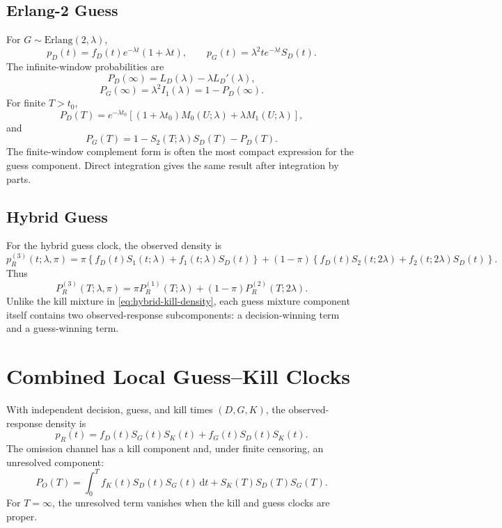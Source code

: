 \documentclass[12pt]{article}
\newcommand{\dd}{\,\mathrm{d}}
\begin{document}
\subsection{Erlang-2 Guess}
For $G\sim\mathrm{Erlang}(2,\lambda)$,
\begin{equation}
  p_D(t)=f_D(t)e^{-\lambda t}(1+\lambda t),
  \qquad
  p_G(t)=\lambda^2t e^{-\lambda t}S_D(t).
\end{equation}
The infinite-window probabilities are
\begin{equation}
  P_D(\infty)=L_D(\lambda)-\lambda L_D'(\lambda),
\end{equation}
\begin{equation}
  P_G(\infty)=\lambda^2I_1(\lambda)
  =1-P_D(\infty).
  \label{eq:erlang2-guess-probs}
\end{equation}
For finite $T>t_0$,
\begin{equation}
  P_D(T)=e^{-\lambda t_0}
  \left[(1+\lambda t_0)M_0(U;\lambda)+\lambda M_1(U;\lambda)\right],
\end{equation}
and
\begin{equation}
  P_G(T)=1-S_2(T;\lambda)S_D(T)-P_D(T).
  \label{eq:erlang2-guess-window}
\end{equation}
The finite-window complement form is often the most compact expression for the guess component. Direct integration gives the same result after integration by parts.

\subsection{Hybrid Guess}
For the hybrid guess clock, the observed density is
\begin{equation}
  p_R^{(3)}(t;\lambda,\pi)
  =
  \pi\left\{f_D(t)S_1(t;\lambda)+f_1(t;\lambda)S_D(t)\right\}
  +(1-\pi)\left\{f_D(t)S_2(t;2\lambda)+f_2(t;2\lambda)S_D(t)\right\}.
  \label{eq:hybrid-guess-density}
\end{equation}
Thus
\begin{equation}
  P_R^{(3)}(T;\lambda,\pi)
  =
  \pi P_R^{(1)}(T;\lambda)
  +(1-\pi)P_R^{(2)}(T;2\lambda).
\end{equation}
Unlike the kill mixture in \eqref{eq:hybrid-kill-density}, each guess mixture component itself contains two observed-response subcomponents: a decision-winning term and a guess-winning term.

\section{Combined Local Guess--Kill Clocks}
With independent decision, guess, and kill times $(D,G,K)$, the observed-response density is
\begin{equation}
  p_R(t)=f_D(t)S_G(t)S_K(t)+f_G(t)S_D(t)S_K(t).
  \label{eq:local-density}
\end{equation}
The omission channel has a kill component and, under finite censoring, an unresolved component:
\begin{equation}
  P_O(T)=\int_0^T f_K(t)S_D(t)S_G(t)\dd t
  +S_K(T)S_D(T)S_G(T).
  \label{eq:combined-omission}
\end{equation}
For $T=\infty$, the unresolved term vanishes when the kill and guess clocks are proper.
\end{document}
